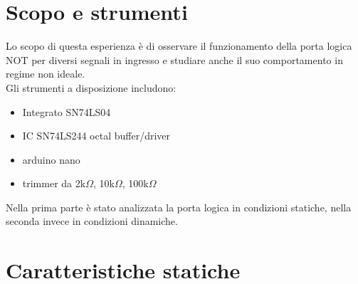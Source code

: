 \section{Scopo e strumenti}
Lo scopo di questa esperienza è di osservare il funzionamento della porta logica NOT per diversi segnali in ingresso e studiare anche il suo comportamento in regime non ideale.\\
Gli strumenti a disposizione includono:
\begin{itemize}
\item{Integrato SN74LS04}
\item{IC SN74LS244 octal buffer/driver}
\item{arduino nano}
\item{trimmer da 2k$\Omega$, 10k$\Omega$, 100k$\Omega$}
\end{itemize}
Nella prima parte è stato analizzata la porta logica in condizioni statiche, nella seconda invece in condizioni dinamiche.\\

\section{Caratteristiche statiche}
